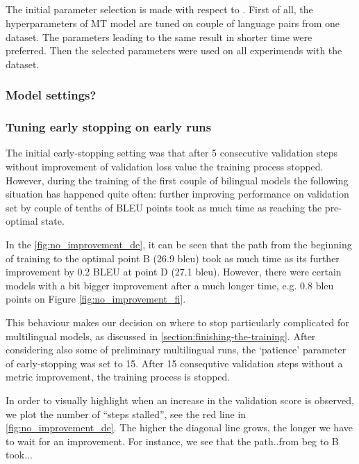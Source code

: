 \subsection{}

The initial parameter selection is made with respect to \cite{training-tips}.
First of all, the hyperparameters of MT model are tuned
on couple of language pairs from one dataset.
The parameters leading to the same result in shorter time were preferred.
Then the selected parameters were used on all experimends with the dataset.

\subsubsection*{Model settings?}


\subsubsection*{Tuning early stopping on early runs}

The initial \gls{early-stopping} setting was that after 5 consecutive
validation steps without improvement of validation \gls{loss} value
the training process stopped.
However, during the training of the first couple of bilingual models
the following situation has happened quite often:
further improving performance on validation set by
couple of tenths of BLEU points took as much time as reaching
the pre-optimal state.

In the \cref{fig:no_improvement_de}, it  can be seen that the path from
the beginning of training to the optimal point B (26.9 \acrshort{bleu})
took as much time as its further improvement by 0.2 BLEU
at point D (27.1 \acrshort{bleu}). However, there were certain models
with a bit bigger improvement after a much longer time, e.g.
0.8 \acrshort{bleu} points on Figure \ref{fig:no_improvement_fi}.

This behaviour makes our decision on where to stop particularly
complicated for multilingual models, as discussed in
\cref{section:finishing-the-training}.
After considering also some of preliminary multilingual runs,
the `patience' parameter of \gls{early-stopping} was set to 15.
After 15 consequtive validation steps without a metric improvement,
the training process is stopped.

In order to visually highlight when an increase in the validation score
is observed, we plot the number of ``steps stalled'',
see the red line in \cref{fig:no_improvement_de}.
The higher the diagonal line grows, the longer we have to wait for an improvement.
For instance, we see that the path..from beg to B took...

